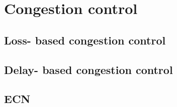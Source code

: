 \section{Congestion control}
\subsection{Loss- based congestion control}
\subsection{Delay- based congestion control}
\subsection{ECN}%
